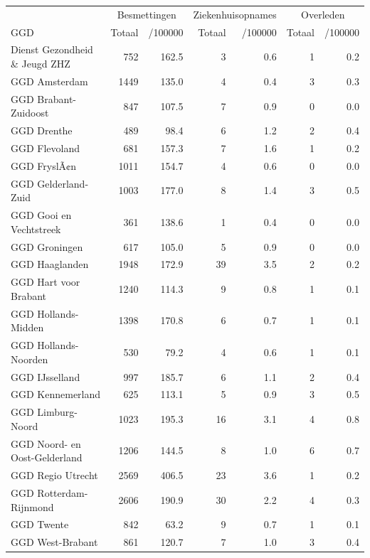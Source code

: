 \documentclass[
  english,
  man,floatsintext]{apa6}
\begin{document}
\begin{table}
\centering\begingroup\fontsize{10}{12}\selectfont

\begin{threeparttable}
\begin{tabular}{lrrrrrr}
\toprule
\multicolumn{1}{c}{ } & \multicolumn{2}{c}{Besmettingen} & \multicolumn{2}{c}{Ziekenhuisopnames} & \multicolumn{2}{c}{Overleden} \\
\cmidrule(l{3pt}r{3pt}){2-3} \cmidrule(l{3pt}r{3pt}){4-5} \cmidrule(l{3pt}r{3pt}){6-7}
GGD & Totaal & /100000 & Totaal & /100000 & Totaal & /100000\\
\midrule
Dienst Gezondheid \& Jeugd ZHZ & 752 & 162.5 & 3 & 0.6 & 1 & 0.2\\
GGD Amsterdam & 1449 & 135.0 & 4 & 0.4 & 3 & 0.3\\
GGD Brabant-Zuidoost & 847 & 107.5 & 7 & 0.9 & 0 & 0.0\\
GGD Drenthe & 489 & 98.4 & 6 & 1.2 & 2 & 0.4\\
GGD Flevoland & 681 & 157.3 & 7 & 1.6 & 1 & 0.2\\
GGD FryslÃ¢n & 1011 & 154.7 & 4 & 0.6 & 0 & 0.0\\
GGD Gelderland-Zuid & 1003 & 177.0 & 8 & 1.4 & 3 & 0.5\\
GGD Gooi en Vechtstreek & 361 & 138.6 & 1 & 0.4 & 0 & 0.0\\
GGD Groningen & 617 & 105.0 & 5 & 0.9 & 0 & 0.0\\
GGD Haaglanden & 1948 & 172.9 & 39 & 3.5 & 2 & 0.2\\
GGD Hart voor Brabant & 1240 & 114.3 & 9 & 0.8 & 1 & 0.1\\
GGD Hollands-Midden & 1398 & 170.8 & 6 & 0.7 & 1 & 0.1\\
GGD Hollands-Noorden & 530 & 79.2 & 4 & 0.6 & 1 & 0.1\\
GGD IJsselland & 997 & 185.7 & 6 & 1.1 & 2 & 0.4\\
GGD Kennemerland & 625 & 113.1 & 5 & 0.9 & 3 & 0.5\\
GGD Limburg-Noord & 1023 & 195.3 & 16 & 3.1 & 4 & 0.8\\
GGD Noord- en Oost-Gelderland & 1206 & 144.5 & 8 & 1.0 & 6 & 0.7\\
GGD Regio Utrecht & 2569 & 406.5 & 23 & 3.6 & 1 & 0.2\\
GGD Rotterdam-Rijnmond & 2606 & 190.9 & 30 & 2.2 & 4 & 0.3\\
GGD Twente & 842 & 63.2 & 9 & 0.7 & 1 & 0.1\\
GGD West-Brabant & 861 & 120.7 & 7 & 1.0 & 3 & 0.4\\

\end{tabular}
\end{threeparttable}
\end{table}
\end{document}
